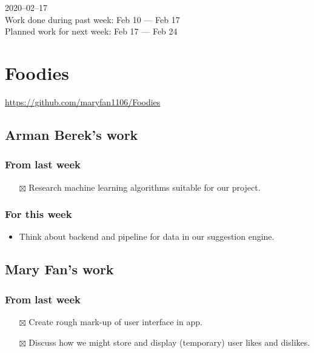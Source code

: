 \documentclass[12pt,letterpaper]{article}
\newcommand{\done}{$\boxtimes$}
\begin{document}
\noindent{}2020--02--17 \\
Work done during  past week: Feb 10 --- Feb 17 \\
Planned work for next week: Feb 17 --- Feb 24

\section*{Foodies}
\noindent{}\url{https://github.com/maryfan1106/Foodies}

\subsection*{Arman Berek's work}
\subsubsection*{From last week}
\begin{itemize}
  \item[\done] Research machine learning algorithms suitable for our project.
\end{itemize}


\subsubsection*{For this week}
\begin{itemize}
  \item Think about backend and pipeline for data in our suggestion engine.
\end{itemize}


\vfill
\subsection*{Mary Fan's work}
\subsubsection*{From last week}
\begin{itemize}
  \item[\done] Create rough mark-up of user interface in app.
  \item[\done] Discuss how we might store and display (temporary) user likes and dislikes.
\end{itemize}
\end{document}
